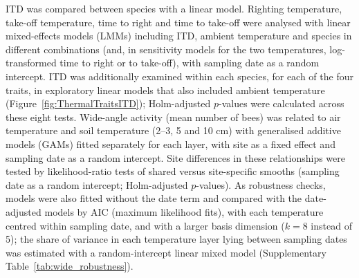 \documentclass[11pt,a4paper]{article}
\begin{document}
ITD was compared between species with a linear model. Righting temperature, take-off temperature, time to right and time to take-off were analysed with linear mixed-effects models (LMMs) including ITD, ambient temperature and species in different combinations (and, in sensitivity models for the two temperatures, log-transformed time to right or to take-off), with sampling date as a random intercept. ITD was additionally examined within each species, for each of the four traits, in exploratory linear models that also included ambient temperature (Figure~\ref{fig:ThermalTraitsITD}); Holm-adjusted $p$-values were calculated across these eight tests. Wide-angle activity (mean number of bees) was related to air temperature and soil temperature (2--3, 5 and 10 cm) with generalised additive models (GAMs) fitted separately for each layer, with site as a fixed effect and sampling date as a random intercept. Site differences in these relationships were tested by likelihood-ratio tests of shared versus site-specific smooths (sampling date as a random intercept; Holm-adjusted $p$-values). As robustness checks, models were also fitted without the date term and compared with the date-adjusted models by AIC (maximum likelihood fits), with each temperature centred within sampling date, and with a larger basis dimension ($k = 8$ instead of 5); the share of variance in each temperature layer lying between sampling dates was estimated with a random-intercept linear mixed model (Supplementary Table~\ref{tab:wide_robustness}).
\end{document}
